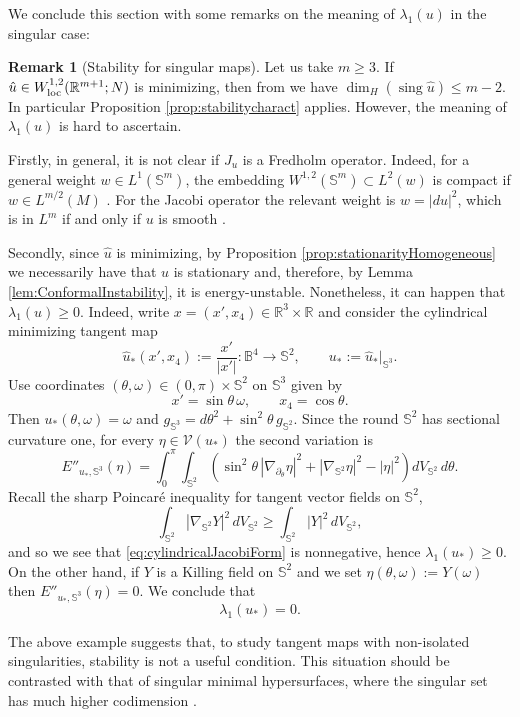 \documentclass[11pt]{article}
\theoremstyle{plain}
\numberwithin{equation}{section}
\theoremstyle{definition}
\newtheorem{remark}[theorem]{Remark}
\def \R {\mathbb{R}}
\def \mc{\mathcal}
\def \mb{\mathbb}
\def \tp{\textup}
\DeclareMathOperator{\sing}{sing}
\begin{document}
We conclude this section with some remarks on the meaning of $\lambda_1(u)$ in the singular case:
\begin{remark}[Stability for singular maps]\label{rem:stabsing} 
Let us take $m\geq 3$. If $\hat u\in W^{1,2}_\tp{loc}(\R^{m+1};N)$ is minimizing, then
from \cite{SchoenUhlenbeck1982} we have $\dim_H(\sing\hat u)\leq m-2$. In particular Proposition \ref{prop:stabilitycharact} applies. However, the meaning of $\lambda_1(u)$ is hard to ascertain. 

Firstly, in general, it is not clear if $J_u$ is a Fredholm operator. Indeed, for a general weight $w\in L^1(\mb S^m)$, the embedding $W^{1,2}(\mb S^m)\subset L^2(w)$ is compact if $w\in L^{m/2}(M)$ \cite[Example 3.19]{Girouard2021}. For the Jacobi operator the relevant weight is $w=|d u|^2$, which is in $L^{m}$ if and only if $u$ is smooth \cite[Theorem I.2]{Bethuel1993}.

Secondly, since $\hat u$ is minimizing, by Proposition
\ref{prop:stationarityHomogeneous} we necessarily have that $u$ is
stationary and, therefore, by Lemma \ref{lem:ConformalInstability}, it is
energy-unstable.  Nonetheless, it can happen that $\lambda_1(u)\geq0$.
Indeed, write $x=(x',x_4)\in\R^3\times\R$ and consider the cylindrical minimizing tangent map
\[
    \hat u_*(x',x_4):=\frac{x'}{|x'|}\colon\mb B^4\to\mb S^2,
    \qquad
    u_*:=\hat u_*|_{\mb S^3}.
\]
Use coordinates $(\theta,\omega)\in(0,\pi)\times\mb S^2$ on
$\mb S^3$ given by
\[
    x'=\sin\theta\,\omega,
    \qquad x_4=\cos\theta.
\]
Then $u_*(\theta,\omega)=\omega$ and
$g_{\mb S^3}=d\theta^2+\sin^2\theta\,g_{\mb S^2}$.  Since the round
$\mb S^2$ has sectional curvature one, for every
$\eta\in\mc V(u_*)$ the second variation is
\begin{equation}
    \label{eq:cylindricalJacobiForm}
    E''_{u_*,\mb S^3}(\eta)
    =\int_0^\pi\int_{\mb S^2}
      \left(
        \sin^2\theta\,|\nabla_{\partial_\theta}\eta|^2
        +|\nabla_{\mb S^2}\eta|^2-|\eta|^2
      \right)dV_{\mb S^2}\,d\theta.
\end{equation}
Recall the sharp Poincaré inequality for tangent vector fields on $\mb S^2$,
\[
    \int_{\mb S^2}|\nabla_{\mb S^2}Y|^2\,dV_{\mb S^2}
    \geq\int_{\mb S^2}|Y|^2\,dV_{\mb S^2},
\]
and so we see that \eqref{eq:cylindricalJacobiForm} is nonnegative,
hence $\lambda_1(u_*)\geq0$.  On the other hand, if $Y$ is a 
Killing field on $\mb S^2$ and we set $\eta(\theta,\omega):=Y(\omega)$ then $E''_{u_*,\mb S^3}(\eta)=0$.  We conclude that
\[
    \lambda_1(u_*)=0.
\]

The above example suggests that, to study tangent maps with non-isolated singularities, stability is not a useful condition. This situation should be contrasted with that of singular minimal hypersurfaces, where the singular set has much higher codimension \cite{Zhu2018}.
\end{remark}
\end{document}
